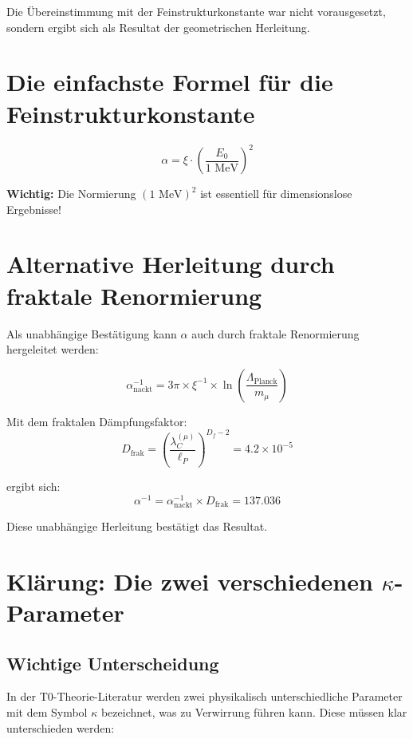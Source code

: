 	Die Übereinstimmung mit der Feinstrukturkonstante war nicht vorausgesetzt, sondern ergibt sich als Resultat der geometrischen Herleitung.
	\section*{Die einfachste Formel für die Feinstrukturkonstante}

\[
\boxed{\alpha = \xi \cdot \left(\frac{E_0}{1 \text{ MeV}}\right)^2}
\]
\begin{tcolorbox}[colback=red!5!white,colframe=red!75!black]
	\textbf{Wichtig:} Die Normierung $(1 \text{ MeV})^2$ ist essentiell für dimensionslose Ergebnisse!
\end{tcolorbox}	
	\section{Alternative Herleitung durch fraktale Renormierung}
	
	Als unabhängige Bestätigung kann $\alpha$ auch durch fraktale Renormierung hergeleitet werden:
	
	\begin{equation}
		\alpha_{\text{nackt}}^{-1} = 3\pi \times \xi^{-1} \times \ln\left(\frac{\Lambda_{\text{Planck}}}{m_\mu}\right)
	\end{equation}
	
	Mit dem fraktalen Dämpfungsfaktor:
	\begin{equation}
		D_{\text{frak}} = \left(\frac{\lambda_C^{(\mu)}}{\ell_P}\right)^{D_f-2} = 4.2 \times 10^{-5}
	\end{equation}
	
	ergibt sich:
	\begin{equation}
		\alpha^{-1} = \alpha_{\text{nackt}}^{-1} \times D_{\text{frak}} = 137.036
	\end{equation}
	
	Diese unabhängige Herleitung bestätigt das Resultat.
	
	\section{Klärung: Die zwei verschiedenen $\kappa$-Parameter}
	
	\subsection{Wichtige Unterscheidung}
	
	In der T0-Theorie-Literatur werden zwei physikalisch unterschiedliche Parameter mit dem Symbol $\kappa$ bezeichnet, was zu Verwirrung führen kann. Diese müssen klar unterschieden werden:
	
